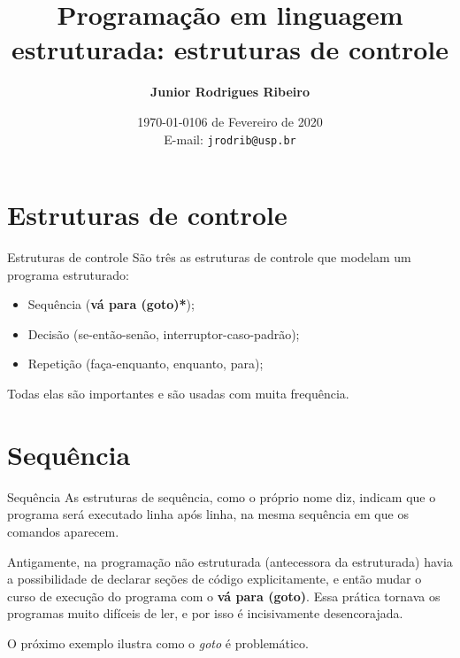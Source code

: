 \documentclass{beamer}%
\title[Estruturas de Controle]
{Programação em linguagem estruturada: estruturas de controle} %
\author{\bf Junior Rodrigues Ribeiro} %
\institute[ICMC] %
{
USP --- ICMC \\ %
}
\date{\today} %
\date{\small 06 de Fevereiro de 2020 \\[.3cm] E-mail: \texttt{jrodrib@usp.br}}
\begin{document}
\begin{frame}
\titlepage
\end{frame}




\section[Estruturas]{Estruturas de controle}
\begin{frame}{Estruturas de controle}
São três as estruturas de controle que modelam um programa estruturado:
\begin{itemize}
\item Sequência (\textbf{vá para (goto)*});
\item Decisão (se-então-senão, interruptor-caso-padrão);
\item Repetição (faça-enquanto, enquanto, para);
\end{itemize}
Todas elas são importantes e são usadas com muita frequência.

\end{frame}



\section{Sequência}
\begin{frame}{Sequência}
As estruturas de sequência, como o próprio nome diz, indicam que o
programa será executado linha após linha, na mesma sequência em que
os comandos aparecem.

Antigamente, na programação não estruturada (antecessora da estruturada) havia a possibilidade de declarar seções de código explicitamente, e então mudar o curso de execução do programa com o \textbf{vá para (goto)}. Essa prática tornava os programas muito difíceis de ler, e por isso é incisivamente desencorajada.

O próximo exemplo ilustra como o \textit{goto} é problemático.
\end{frame}
\end{document}
